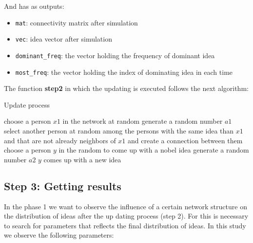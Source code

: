  And has as outputs:
 \begin{itemize}
 \item \verb+mat+: connectivity matrix after simulation
\item \verb+vec+: idea vector after simulation
\item \verb+dominant_freq+: the vector holding the frequency of dominant idea
 \item \verb+most_freq+: the vector holding the index of dominating idea in each time
\end{itemize}

\bigskip
\noindent The function \textbf{step2} in which the updating is executed follows the next algorithm:

\begin{algorithm}                      %
\caption{Update process}          %
\label{alg1}                           %
\begin{algorithmic}                    %
    	\State choose a person $x1$ in the network at random
	\State generate a random number $a1$
     
        \State select another person at random among the persons with the same idea than $x1$ and that are not already neighbors of $x1$ and create a connection between them
            \EndIf
    \State choose a person $y$ in the random to come up with a nobel idea
    \State generate a random number $a2$
     $y$ comes up with a new idea 
     \EndIf
   \EndFor
\end{algorithmic}
\end{algorithm}

\subsection{Step 3: Getting results}

In the phase 1 we want to observe the influence of a certain network structure  on the distribution of ideas after the up dating process (step 2). For this is necessary to search for parameters that reflects the final distribution of ideas. In this study we observe the following parameters:

